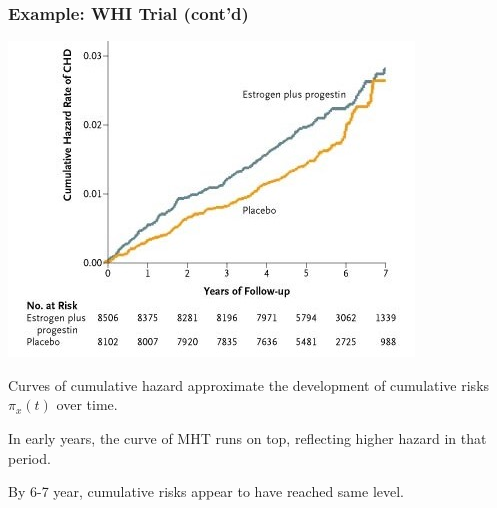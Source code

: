 \documentclass[12pt,dvipsnames,t,aspectratio=169, handout%
]{beamer}
\begin{document}
\begin{frame}
\frametitle{\large Example: WHI Trial (cont'd)}

\begin{minipage}[b]{0.57\linewidth}
\includegraphics[width=\textwidth]{whi-on-mht-chd}
\end{minipage}
\hfill
\begin{minipage}[b]{0.42\linewidth}
{\small
\raggedright
\bi
\item
Curves of cumulative hazard approximate
the development of
cumulative risks $\pi_x(t)$ over time.
\item
In early years,
the curve of MHT runs on top, reflecting
higher hazard in that period.
\item
By 6-7 year, 
cumulative risks appear
to have reached same level.
\ei
}
\end{minipage}
\end{frame}
\end{document}
